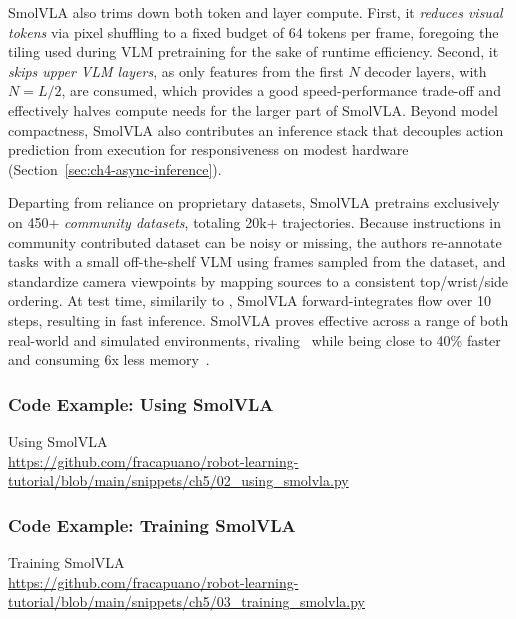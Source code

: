 SmolVLA also trims down both token and layer compute.
First, it \emph{reduces visual tokens} via pixel shuffling to a fixed budget of 64 tokens per frame, foregoing the tiling used during VLM pretraining for the sake of runtime efficiency. 
Second, it \emph{skips upper VLM layers}, as only features from the first \(N\) decoder layers, with \(N=L/2\), are consumed, which provides a good speed-performance trade-off and effectively halves compute needs for the larger part of SmolVLA.
Beyond model compactness, SmolVLA also contributes an inference stack that decouples action prediction from execution for responsiveness on modest hardware (Section~\ref{sec:ch4-async-inference}).

Departing from reliance on proprietary datasets, SmolVLA pretrains exclusively on 450+ \emph{community datasets}, totaling 20k+ trajectories. 
Because instructions in community contributed dataset can be noisy or missing, the authors re-annotate tasks with a small off-the-shelf VLM using frames sampled from the dataset, and standardize camera viewpoints by mapping sources to a consistent top/wrist/side ordering.
At test time, similarily to \pizero, SmolVLA forward-integrates flow over 10 steps, resulting in fast inference.
SmolVLA proves effective across a range of both real-world and simulated environments, rivaling \pizero~while being close to 40\% faster and consuming 6x less memory~\citep{shukorSmolVLAVisionLanguageActionModel2025}.

\subsubsection{Code Example: Using SmolVLA}
\begin{pbox}[label={ex:using-smolvla}]{Using SmolVLA \\ \url{https://github.com/fracapuano/robot-learning-tutorial/blob/main/snippets/ch5/02_using_smolvla.py}}
    
\end{pbox}

\subsubsection{Code Example: Training SmolVLA}
\begin{pbox}[label={ex:training-smolvla}]{Training SmolVLA \\ \url{https://github.com/fracapuano/robot-learning-tutorial/blob/main/snippets/ch5/03_training_smolvla.py}}
    
\end{pbox}